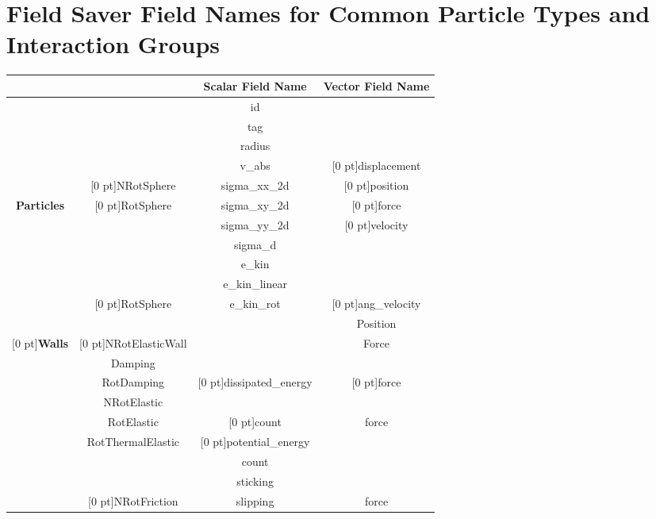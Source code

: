 \section{Field Saver Field Names for Common Particle Types and Interaction Groups}\label{table:field_names}
\begin{table}[h]
\begin{center}
\begin{tabular}{|c|c|c|c|} \cline{3-4} 
  \multicolumn{2}{c|}{} & \textbf{Scalar Field Name} & \textbf{Vector Field Name}\\
  \hline
  &  & id & \\
  &  & tag & \\
  &  & radius & \\
  &  & v\_abs & \raisebox{1.25 ex}[0 pt]{displacement}\\
  & \raisebox{1.25 ex}[0 pt]{NRotSphere} & sigma\_xx\_2d & \raisebox{1.25 ex}[0 pt]{position}\\
  \textbf{Particles} & \raisebox{1.25 ex}[0 pt]{RotSphere} & sigma\_xy\_2d & \raisebox{1.25 ex}[0 pt]{force}\\
  &  & sigma\_yy\_2d & \raisebox{1.25 ex}[0 pt]{velocity}\\
  &  & sigma\_d & \\
  &  & e\_kin & \\
  \cline{2-4}
  &  & e\_kin\_linear & \\
  & \raisebox{1.25 ex}[0 pt]{RotSphere} & e\_kin\_rot & \raisebox{1.25 ex}[0 pt]{ang\_velocity}\\
  \hline\hline 
  &  &  & Position\\
  \raisebox{1.25 ex}[0 pt]{\textbf{Walls}} & \raisebox{1.25 ex}[0 pt]{NRotElasticWall} &  & Force\\
  \hline\hline 
  & Damping &  & \\
  & RotDamping & \raisebox{1.25 ex}[0 pt]{dissipated\_energy} & \raisebox{1.25 ex}[0 pt]{force}\\
  \cline{2-4}
  & NRotElastic &  & \\
  & RotElastic & \raisebox{1.25 ex}[0 pt]{count} & force\\
  & RotThermalElastic & \raisebox{1.25 ex}[0 pt]{potential\_energy} & \\
  \cline{2-4}
  &  & count & \\
  &  & sticking & \\
  & \raisebox{1.25 ex}[0 pt]{NRotFriction} & slipping & force\\

\end{tabular}
\end{center}
\end{table}

